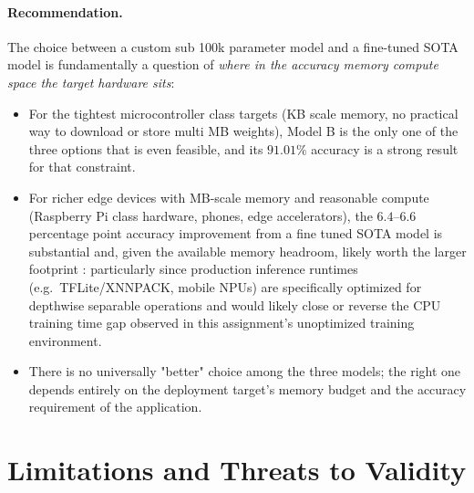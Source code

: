 \documentclass[11pt]{article}
\begin{document}
\paragraph{Recommendation.} The choice between a custom sub 100k parameter
model and a fine-tuned SOTA model is fundamentally a question of \emph{where
in the accuracy memory compute space the target hardware sits}:
\begin{itemize}
  \item For the tightest microcontroller class targets (KB scale memory, no
  practical way to download or store multi MB weights), Model B is the only
  one of the three options that is even feasible, and its $91.01\%$
  accuracy is a strong result for that constraint.
  \item For richer edge devices with MB-scale memory and reasonable compute
  (Raspberry Pi class hardware, phones, edge accelerators), the
  $6.4$--$6.6$ percentage point accuracy improvement from a fine tuned SOTA
  model is substantial and, given the available memory headroom, likely
  worth the larger footprint : particularly since production inference
  runtimes (e.g.\ TFLite/XNNPACK, mobile NPUs) are specifically optimized
  for depthwise separable operations and would likely close or reverse the
  CPU training time gap observed in this assignment's unoptimized training
  environment.
  \item There is no universally "better" choice among the three models;
  the right one depends entirely on the deployment target's memory budget
  and the accuracy requirement of the application.
\end{itemize}

\section{Limitations and Threats to Validity}
\label{sec:limitations}
\end{document}
